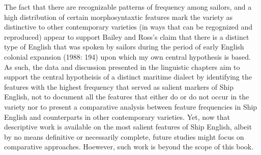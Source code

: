   The fact that there are recognizable patterns of frequency among sailors, and a high distribution of certain morphosyntaxtic features mark the variety as distinctive to other contemporary varieties (in ways that can be regognized and reproduced) appear to support Bailey and Ross’s claim that there is a distinct type of English that was spoken by sailors during the period of early English colonial expansion (1988: 194) upon which my own central hypothesis is based. As such, the data and discussion presented in the linguistic chapters aim to support the central hypotheisis of a distinct maritime dialect by identifying the features with the highest frequency that served as salient markers of Ship English, not to document all the features that either do or do not occur in the variety nor to present a comparative analysis between feature frequencies in Ship English and counterparts in other contemporary varieties. Yet, now that descriptive work is available on the most salient features of Ship English, albeit by no means definitive or necessarily complete, future studies might focus on comparative approaches. Hoewever, such work is beyond the scope of this book. 

